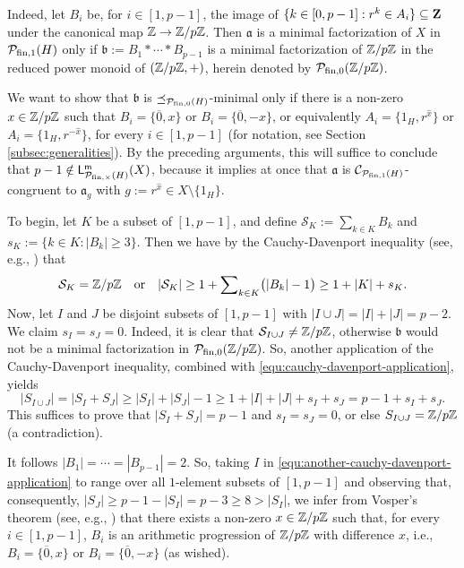 \begin{eg}
	Indeed, let $B_i$ be, for $i \in [ 1, p-1 ]$, the image of $\{k \in [ 0, p-1 ]: r^k \in A_i\} \subseteq \bf Z$ under the canonical map $\mathbb{Z} \to \mathbb{Z}/p\mathbb{Z}$. Then $\mathfrak a$ is a minimal factorization of $X$ in $\mathcal P_{\textrm{fin},1}(H)$ only if $\mathfrak b := B_1 \ast \cdots \ast B_{p-1}$ is a minimal factorization of $\mathbb{Z}/p\mathbb{Z}$ in the reduced power monoid of $(\mathbb{Z}/p\mathbb{Z}, +)$, herein denoted by $\mathcal P_{\textrm{fin},0}(\mathbb{Z}/p\mathbb{Z})$.
	
	We want to show that $\mathfrak b$ is $\preceq_{\mathcal P_{\textrm{fin},0}(H)}$-minimal only if there is a non-zero $x \in \mathbb{Z}/p\mathbb{Z}$ such that $B_i = \{\overline{0}, x\}$ or $B_i = \{\overline{0}, -x\}$, or equivalently $A_i = \{1_H, r^{\hat{x}}\}$ or $A_i = \{1_H, r^{-\hat{x}}\}$, for every $i \in [ 1, p-1 ]$ (for notation, see Section \ref{subsec:generalities}). By the preceding arguments, this will suffice to conclude that $p-1 \notin \mathsf L^{\mathsf{m}}_{\mathcal P_{\textrm{fin}, \times}(H)}(X)$, because it implies at once that $\mathfrak a$ is $\mathcal C_{\mathcal P_{\textrm{fin}, 1}(H)}$-congruent to $\mathfrak a_g$ with $g := r^{\hat{x}} \in X \setminus \{1_H\}$.
	
	To begin, let $K$ be a subset of $[ 1, p-1 ]$, and define $\mathcal{S}_K := \sum_{k \in K} B_k$ and $s_K := \{k \in K: |B_k| \ge 3\}$. Then we have by the Cauchy-Davenport inequality (see, e.g., \cite[Theorem 6.2]{grynkiewicz13}) that
	\begin{equation}\label{equ:cauchy-davenport-application}
	\mathcal{S}_K = \mathbb{Z}/p\mathbb{Z} 
	\quad\text{or}\quad
	|\mathcal{S}_K| \ge 1 + {\sum}_{k \in K} \bigl(|B_k| - 1\bigr) \ge 1 + |K| + s_K.
	\end{equation}
	Now, let $I$ and $J$ be disjoint subsets of $[ 1, p-1 ]$ with $|I \cup J| = |I| + |J| = p-2$. We claim $s_I = s_J = 0$. Indeed, it is clear that $\mathcal{S}_{I \cup J} \ne \mathbb{Z}/p\mathbb{Z}$, otherwise $\mathfrak b$ would not be a minimal factorization in $\mathcal P_{\textrm{fin},0}(\mathbb{Z}/p\mathbb{Z})$. So, another application of the Cauchy-Davenport inequality, combined with \eqref{equ:cauchy-davenport-application}, yields
	\begin{equation}\label{equ:another-cauchy-davenport-application}
	|S_{I \cup J}| = |S_I + S_J| \ge |S_I| + |S_J| - 1 \ge 1 + |I| + |J| + s_I + s_J = p-1 + s_I + s_J.
	\end{equation}
	This suffices to prove that $|S_I + S_J| = p-1$ and $s_I = s_J = 0$, or else $S_{I \cup J} = \mathbb{Z}/p\mathbb{Z}$ (a contradiction). 
	
	It follows $|B_1| = \cdots = |B_{p-1}| = 2$. So, taking $I$ in \eqref{equ:another-cauchy-davenport-application} to range over all $1$-element subsets of $[ 1, p-1 ]$ and observing that, consequently, $|S_J| \ge p-1-|S_I| = p-3 \ge 8 > |S_I|$, we infer from Vosper's theorem (see, e.g., \cite[Theorem 8.1]{grynkiewicz13}) that there exists a non-zero $x \in \mathbb{Z}/p\mathbb{Z}$ such that, for every $i \in [ 1, p-1 ]$, $B_i$ is an arithmetic progression of $\mathbb{Z}/p\mathbb{Z}$ with difference $x$, i.e., $B_i = \{\overline{0}, x\}$ or $B_i = \{\overline{0}, -x\}$ (as wished).
\end{eg}



